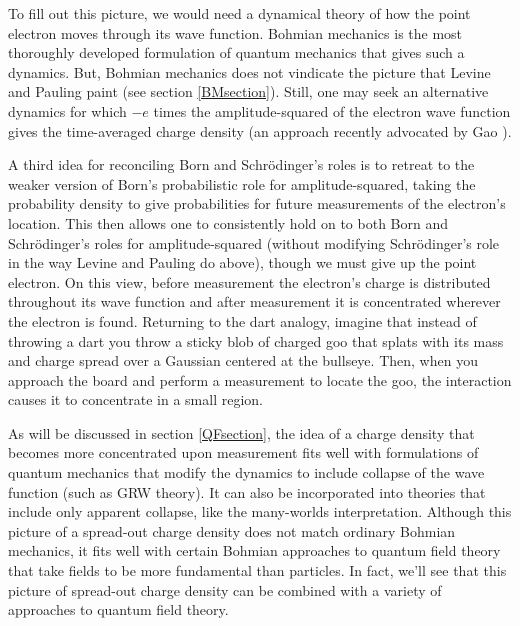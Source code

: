 \documentclass[12pt,onecolumn,secnumarabic,amsmath,amssymb,balancelastpage,nofootinbib]{article}
\begin{document}
To fill out this picture, we would need a dynamical theory of how the point electron moves through its wave function.  Bohmian mechanics is the most thoroughly developed formulation of quantum mechanics that gives such a dynamics.  But, Bohmian mechanics does not vindicate the picture that Levine and Pauling paint (see section \ref{BMsection}).  Still, one may seek an alternative dynamics for which $-e$ times the amplitude-squared of the electron wave function gives the time-averaged charge density (an approach recently advocated by Gao \cite{gao2014, gao2017, gao2018, gao2020}).

A third idea for reconciling Born and Schr\"{o}dinger's roles is to retreat to the weaker version of Born's probabilistic role for amplitude-squared, taking the probability density to give probabilities for future measurements of the electron's location.  This then allows one to consistently hold on to both Born and Schr\"{o}dinger's roles for amplitude-squared (without modifying Schr\"{o}dinger's role in the way Levine and Pauling do above), though we must give up the point electron.  On this view, before measurement the electron's charge is distributed throughout its wave function and after measurement it is concentrated wherever the electron is found.  Returning to the dart analogy, imagine that instead of throwing a dart you throw a sticky blob of charged goo that splats with its mass and charge spread over a Gaussian centered at the bullseye.  Then, when you approach the board and perform a measurement to locate the goo, the interaction causes it to concentrate in a small region.

As will be discussed in section \ref{QFsection}, the idea of a charge density that becomes more concentrated upon measurement fits well with formulations of quantum mechanics that modify the dynamics to include collapse of the wave function (such as GRW theory).  It can also be incorporated into theories that include only apparent collapse, like the many-worlds interpretation.  Although this picture of a spread-out charge density does not match ordinary Bohmian mechanics, it fits well with certain Bohmian approaches to quantum field theory that take fields to be more fundamental than particles.  In fact, we'll see that this picture of spread-out charge density can be combined with a variety of approaches to quantum field theory.
\end{document}
